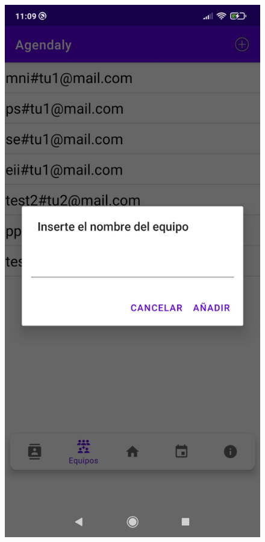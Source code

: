 \documentclass[a4paper,openright,12pt]{article}
\begin{document}
\begin{figure}
    \includegraphics[scale=0.05]{add_team.jpeg}\hfill

\end{figure}
\end{document}
